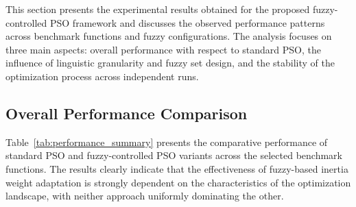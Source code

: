 \documentclass[runningheads]{llncs}
\begin{document}
This section presents the experimental results obtained for the proposed fuzzy-controlled PSO framework and discusses the observed performance patterns across benchmark functions and fuzzy configurations. The analysis focuses on three main aspects: overall performance with respect to standard PSO, the influence of linguistic granularity and fuzzy set design, and the stability of the optimization process across independent runs.

\vspace{-0.25cm}
\subsection{Overall Performance Comparison}
\label{subsec:overall_results}

Table~\ref{tab:performance_summary} presents the comparative performance of standard PSO and fuzzy-controlled PSO variants across the selected benchmark functions. The results clearly indicate that the effectiveness of fuzzy-based inertia weight adaptation is strongly dependent on the characteristics of the optimization landscape, with neither approach uniformly dominating the other.
\end{document}
